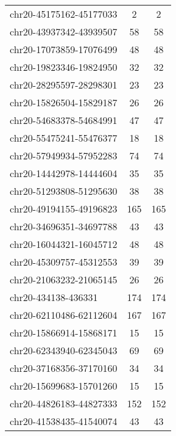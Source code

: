 \begin{longtable}{lSS}
	chr20-45175162-45177033 & 2    & 2                               \\
	chr20-43937342-43939507 & 58   & 58                              \\
	chr20-17073859-17076499 & 48   & 48                              \\
	chr20-19823346-19824950 & 32   & 32                              \\
	chr20-28295597-28298301 & 23   & 23                              \\
	chr20-15826504-15829187 & 26   & 26                              \\
	chr20-54683378-54684991 & 47   & 47                              \\
	chr20-55475241-55476377 & 18   & 18                              \\
	chr20-57949934-57952283 & 74   & 74                              \\
	chr20-14442978-14444604 & 35   & 35                              \\
	chr20-51293808-51295630 & 38   & 38                              \\
	chr20-49194155-49196823 & 165  & 165                             \\
	chr20-34696351-34697788 & 43   & 43                              \\
	chr20-16044321-16045712 & 48   & 48                              \\
	chr20-45309757-45312553 & 39   & 39                              \\
	chr20-21063232-21065145 & 26   & 26                              \\
	chr20-434138-436331     & 174  & 174                             \\
	chr20-62110486-62112604 & 167  & 167                             \\
	chr20-15866914-15868171 & 15   & 15                              \\
	chr20-62343940-62345043 & 69   & 69                              \\
	chr20-37168356-37170160 & 34   & 34                              \\
	chr20-15699683-15701260 & 15   & 15                              \\
	chr20-44826183-44827333 & 152  & 152                             \\
	chr20-41538435-41540074 & 43   & 43                              \\

\end{longtable}
